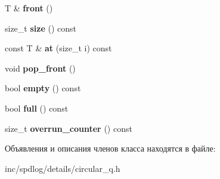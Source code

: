 \begin{DoxyCompactItemize}
\mbox{\label{classspdlog_1_1details_1_1circular__q_af11e3c41b2b75b882f67fafc5d6103c5}} 
T \& {\bfseries front} ()
\item 
\mbox{\label{classspdlog_1_1details_1_1circular__q_aa6f0d090237130c43df80da0497faa3f}} 
size\+\_\+t {\bfseries size} () const
\item 
\mbox{\label{classspdlog_1_1details_1_1circular__q_a9dee4cd65bf38c5a9046bbed11c6f484}} 
const T \& {\bfseries at} (size\+\_\+t i) const
\item 
\mbox{\label{classspdlog_1_1details_1_1circular__q_a4dcd5416ea758a4cfeebf66666ef73dc}} 
void {\bfseries pop\+\_\+front} ()
\item 
\mbox{\label{classspdlog_1_1details_1_1circular__q_ae4bf7063da55f67b4714ef126455caa6}} 
bool {\bfseries empty} () const
\item 
\mbox{\label{classspdlog_1_1details_1_1circular__q_abdd033a7ac9b14713827e9493eca158a}} 
bool {\bfseries full} () const
\item 
\mbox{\label{classspdlog_1_1details_1_1circular__q_a2f683dc45eca25efad9e415cf73c7ea0}} 
size\+\_\+t {\bfseries overrun\+\_\+counter} () const
\end{DoxyCompactItemize}


Объявления и описания членов класса находятся в файле\+:\begin{DoxyCompactItemize}
\item 
inc/spdlog/details/circular\+\_\+q.\+h\end{DoxyCompactItemize}
